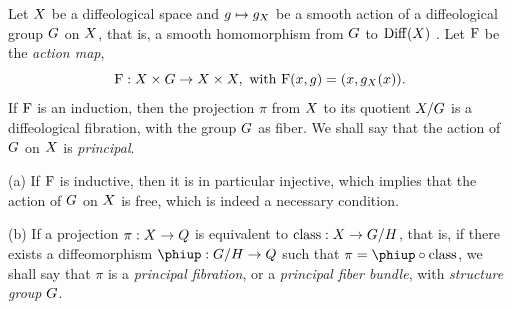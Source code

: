 \begin{article}
  \label{Principal-diffeological-fiber-bundles}
  Let $X$ be a diffeological space and $g \mapsto g_X$ be a smooth action of a diffeological group $G$ on $X$,
  that is,
  a smooth homomorphism from $G$ to $\mathrm{Diff}(X)$ .
  Let $\mathrm{F}$ be the {\em action map},
  $$
  \mathrm{F} : X \times G \to X \times X, \text{ with } \mathrm{F}(x,g) = (x,g_X(x)).
  $$
  \Proposition If $\mathrm{F}$ is an induction,
  then the projection $\pi$ from $X$ to its quotient $X/G$ is a diffeological fibration,
  with the group $G$ as fiber.
  We shall say that the action of $G$ on $X$ is {\em principal}.
  
  (a) If $\mathrm{F}$ is inductive,
  then it is in particular injective,
  which implies that the action of $G$ on $X$ is free,
  which is indeed a necessary condition.
  
  (b) If a projection $\pi : X \to Q$ is equivalent to $\operatorname{class} : X \to G/H$,
  that is,
  if there exists a diffeomorphism $\varphi : \G/\H \to \Q$ such that $\pi = \varphi \circ \class$,
  we shall say that $\pi$ is a {\em principal fibration},
  or a {\em principal fiber bundle},
  with {\em structure group} $G$.
  

\end{article}
